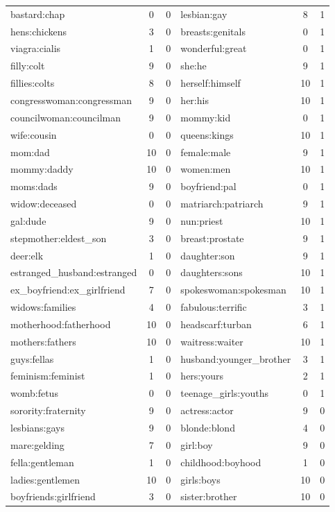 \documentclass{article}
\begin{document}
\begin{longtable}{l|c|c|l|c|c}
bastard:chap & 0 & 0 & lesbian:gay & 8 &1 \\
hens:chickens & 3 & 0 & breasts:genitals & 0 &1 \\
viagra:cialis & 1 & 0 & wonderful:great & 0 &1 \\
filly:colt & 9 & 0 & she:he & 9 &1 \\
fillies:colts & 8 & 0 & herself:himself & 10 &1 \\
congresswoman:congressman & 9 & 0 & her:his & 10 &1 \\
councilwoman:councilman & 9 & 0 & mommy:kid & 0 &1 \\
wife:cousin & 0 & 0 & queens:kings & 10 &1 \\
mom:dad & 10 & 0 & female:male & 9 &1 \\
mommy:daddy & 10 & 0 & women:men & 10 &1 \\
moms:dads & 9 & 0 & boyfriend:pal & 0 &1 \\
widow:deceased & 0 & 0 & matriarch:patriarch & 9 &1 \\
gal:dude & 9 & 0 & nun:priest & 10 &1 \\
stepmother:eldest\_son & 3 & 0 & breast:prostate & 9 &1 \\
deer:elk & 1 & 0 & daughter:son & 9 &1 \\
estranged\_husband:estranged & 0 & 0 & daughters:sons & 10 &1 \\
ex\_boyfriend:ex\_girlfriend & 7 & 0 & spokeswoman:spokesman & 10 &1 \\
widows:families & 4 & 0 & fabulous:terrific & 3 &1 \\
motherhood:fatherhood & 10 & 0 & headscarf:turban & 6 &1 \\
mothers:fathers & 10 & 0 & waitress:waiter & 10 &1 \\
guys:fellas & 1 & 0 & husband:younger\_brother & 3 &1 \\
feminism:feminist & 1 & 0 & hers:yours & 2 &1 \\
womb:fetus & 0 & 0 & teenage\_girls:youths & 0 &1 \\
sorority:fraternity & 9 & 0 & actress:actor & 9 &0 \\
lesbians:gays & 9 & 0 & blonde:blond & 4 &0 \\
mare:gelding & 7 & 0 & girl:boy & 9 &0 \\
fella:gentleman & 1 & 0 & childhood:boyhood & 1 &0 \\
ladies:gentlemen & 10 & 0 & girls:boys & 10 &0 \\
boyfriends:girlfriend & 3 & 0 & sister:brother & 10 &0 \\

\end{longtable}
\end{document}
